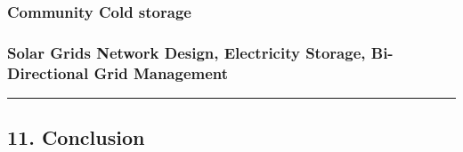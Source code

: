 \subsubsection{Community Cold storage}\label{community-cold-storage}

\subsubsection{Solar Grids Network Design, Electricity Storage,
Bi-Directional Grid
Management}\label{solar-grids-network-design-electricity-storage-bi-directional-grid-management}

\begin{center}\rule{0.5\linewidth}{0.5pt}\end{center}

\subsection{11. Conclusion}\label{conclusion}
